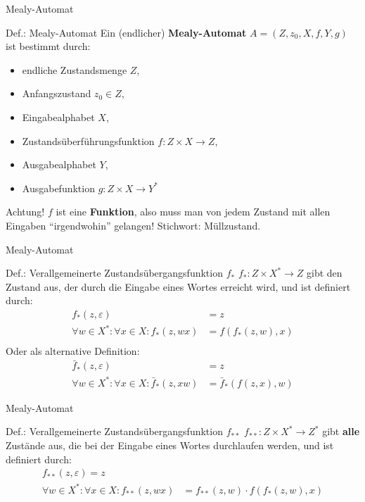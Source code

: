 \begin{frame}{Mealy-Automat}
	\begin{block}{Def.: Mealy-Automat}
		Ein (endlicher) \textbf{Mealy-Automat} $A=(Z, z_0, X, f, Y, g)$ ist bestimmt durch:
		\begin{itemize}
			\item endliche Zustandsmenge $Z$,
			\item Anfangszustand $z_0 \in Z$,
			\item Eingabealphabet $X$,
			\item Zustandsüberführungsfunktion $f: Z \times X \rightarrow Z$,
			\item Ausgabealphabet $Y$,
			\item Ausgabefunktion $g: Z \times X \rightarrow Y^{\ast}$
		\end{itemize}
	\end{block}
\pause
	\begin{alertblock}{Achtung!}
	$f$ ist eine \textbf{Funktion}, also muss man von jedem Zustand mit allen Eingaben ``irgendwohin'' gelangen! Stichwort: Müllzustand.
	\end{alertblock}
\end{frame}



\begin{frame}{Mealy-Automat}
	\begin{block}{Def.: Verallgemeinerte Zustandsübergangsfunktion $f_{\ast}$}
		$f_{\ast} : Z \times X^{\ast} \rightarrow Z$ gibt den Zustand aus, der durch die Eingabe eines Wortes erreicht wird, und ist definiert durch:
		\begin{align*}
			f_{\ast}(z,\varepsilon) &= z \\
			\forall w \in X^{\ast} : \forall x \in X : f_{\ast}(z,wx) &= f(f_{\ast}(z,w),x)\\
		\end{align*}
		Oder als alternative Definition:
		\begin{align*}
			\bar{f}_{\ast}(z,\varepsilon) &= z \\
			\forall w \in X^{\ast} : \forall x \in X : \bar{f}_{\ast}(z,xw) &= \bar{f}_{\ast}(f(z,x),w)
		\end{align*}
	\end{block}
\end{frame}

\begin{frame}{Mealy-Automat}
	\begin{block}{Def.: Verallgemeinerte Zustandsübergangsfunktion $f_{\ast\ast}$}
		$f_{\ast\ast} : Z \times X^{\ast} \rightarrow Z^{\ast}$ gibt \textbf{alle} Zustände aus, die bei der Eingabe eines Wortes durchlaufen werden, und ist definiert durch:
		\begin{align*}
			f_{\ast\ast}(z,\varepsilon) = z\\
			\forall w \in X^{\ast} : \forall x \in X : f_{\ast\ast}(z,wx) &= f_{\ast\ast}(z,w) \cdot f(f_{\ast}(z,w),x)\\
		\end{align*}
	\end{block}
\end{frame}

